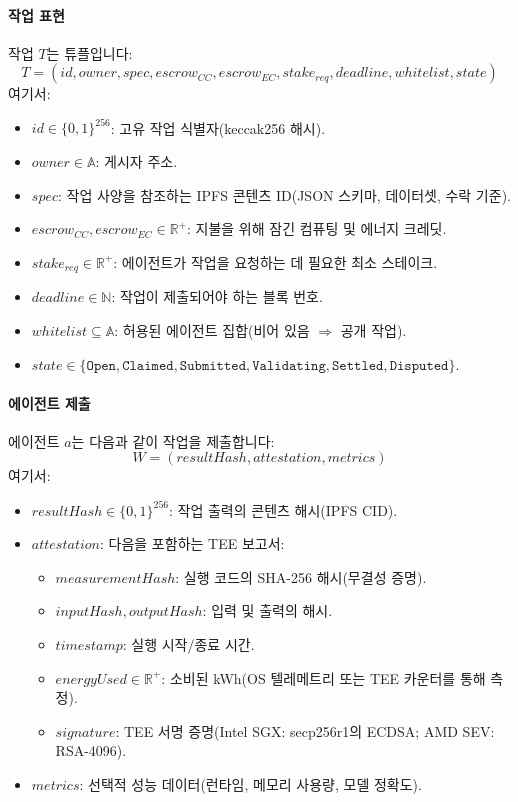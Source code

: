 \documentclass[11pt]{article}
\begin{document}
\paragraph{작업 표현} 작업 $T$는 튜플입니다:
\begin{equation}
T = (id, owner, spec, escrow_{CC}, escrow_{EC}, stake_{req}, deadline, whitelist, state)
\end{equation}
여기서:
\begin{itemize}[noitemsep]
  \item $id \in \{0,1\}^{256}$: 고유 작업 식별자(keccak256 해시).
  \item $owner \in \mathbb{A}$: 게시자 주소.
  \item $spec$: 작업 사양을 참조하는 IPFS 콘텐츠 ID(JSON 스키마, 데이터셋, 수락 기준).
  \item $escrow_{CC}, escrow_{EC} \in \mathbb{R}^+$: 지불을 위해 잠긴 컴퓨팅 및 에너지 크레딧.
  \item $stake_{req} \in \mathbb{R}^+$: 에이전트가 작업을 요청하는 데 필요한 최소 스테이크.
  \item $deadline \in \mathbb{N}$: 작업이 제출되어야 하는 블록 번호.
  \item $whitelist \subseteq \mathbb{A}$: 허용된 에이전트 집합(비어 있음 $\Rightarrow$ 공개 작업).
  \item $state \in \{\texttt{Open}, \texttt{Claimed}, \texttt{Submitted}, \texttt{Validating}, \texttt{Settled}, \texttt{Disputed}\}$.
\end{itemize}

\paragraph{에이전트 제출} 에이전트 $a$는 다음과 같이 작업을 제출합니다:
\begin{equation}
W = (resultHash, attestation, metrics)
\end{equation}
여기서:
\begin{itemize}[noitemsep]
  \item $resultHash \in \{0,1\}^{256}$: 작업 출력의 콘텐츠 해시(IPFS CID).
  \item $attestation$: 다음을 포함하는 TEE 보고서:
    \begin{itemize}[noitemsep]
      \item $measurementHash$: 실행 코드의 SHA-256 해시(무결성 증명).
      \item $inputHash, outputHash$: 입력 및 출력의 해시.
      \item $timestamp$: 실행 시작/종료 시간.
      \item $energyUsed \in \mathbb{R}^+$: 소비된 kWh(OS 텔레메트리 또는 TEE 카운터를 통해 측정).
      \item $signature$: TEE 서명 증명(Intel SGX: secp256r1의 ECDSA; AMD SEV: RSA-4096).
    \end{itemize}
  \item $metrics$: 선택적 성능 데이터(런타임, 메모리 사용량, 모델 정확도).
\end{itemize}
\end{document}
